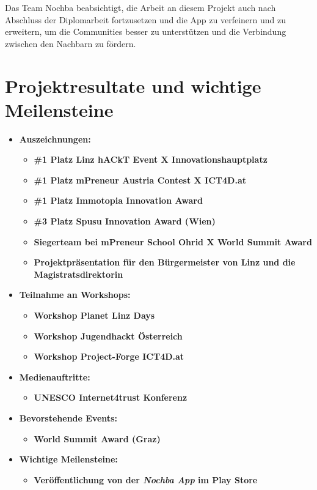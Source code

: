 Das Team Nochba beabsichtigt, die Arbeit an diesem Projekt auch nach Abschluss der Diplomarbeit fortzusetzen und die App zu verfeinern und zu erweitern, um die Communities besser zu unterstützen und die Verbindung zwischen den Nachbarn zu fördern.

\section{Projektresultate und wichtige Meilensteine}

\begin{itemize}
    \item \textbf{Auszeichnungen:}
          \begin{itemize}
              \item \textbf{\#1 Platz Linz hACkT Event X Innovationshauptplatz}
              \item \textbf{\#1 Platz mPreneur Austria Contest X ICT4D.at}
              \item \textbf{\#1 Platz Immotopia Innovation Award}
              \item \textbf{\#3 Platz Spusu Innovation Award (Wien)}
              \item \textbf{Siegerteam bei mPreneur School Ohrid X World Summit Award}
              \item \textbf{Projektpräsentation für den Bürgermeister von Linz und die Magistratsdirektorin}
          \end{itemize}
    \item \textbf{Teilnahme an Workshops:}
          \begin{itemize}
              \item \textbf{Workshop Planet Linz Days}
              \item \textbf{Workshop Jugendhackt Österreich}
              \item \textbf{Workshop Project-Forge ICT4D.at}
          \end{itemize}
    \item \textbf{Medienauftritte:}
          \begin{itemize}
              \item \textbf{UNESCO Internet4trust Konferenz}
          \end{itemize}
    \item \textbf{Bevorstehende Events:}
          \begin{itemize}
              \item \textbf{World Summit Award (Graz)}
          \end{itemize}
    \item \textbf{Wichtige Meilensteine:}
          \begin{itemize}
              \item \textbf{Veröffentlichung von der \textit{Nochba App} im Play Store}
          \end{itemize}
\end{itemize}

